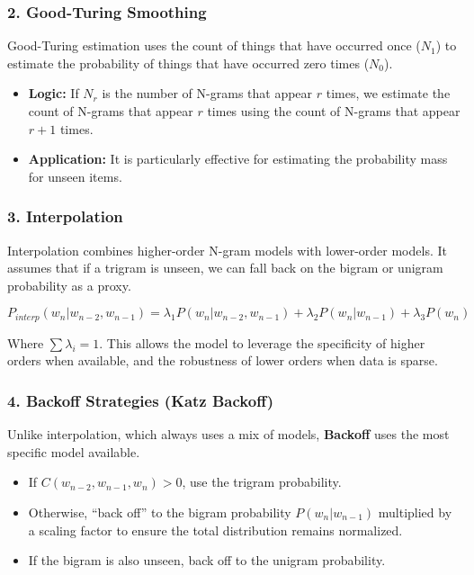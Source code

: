 \documentclass[
  italian,
  11pt,
]{article}
\providecommand{\tightlist}{%
  \setlength{\itemsep}{0pt}\setlength{\parskip}{0pt}}
\begin{document}
\subsubsection{2. Good-Turing Smoothing}\label{good-turing-smoothing}

Good-Turing estimation uses the count of things that have occurred once
(\(N_1\)) to estimate the probability of things that have occurred zero
times (\(N_0\)).

\begin{itemize}
\tightlist
\item
  \textbf{Logic:} If \(N_r\) is the number of N-grams that appear \(r\)
  times, we estimate the count of N-grams that appear \(r\) times using
  the count of N-grams that appear \(r+1\) times.
\item
  \textbf{Application:} It is particularly effective for estimating the
  probability mass for unseen items.
\end{itemize}

\subsubsection{3. Interpolation}\label{interpolation}

Interpolation combines higher-order N-gram models with lower-order
models. It assumes that if a trigram is unseen, we can fall back on the
bigram or unigram probability as a proxy.

\[P_{interp}(w_n | w_{n-2}, w_{n-1}) = \lambda_1 P(w_n | w_{n-2}, w_{n-1}) + \lambda_2 P(w_n | w_{n-1}) + \lambda_3 P(w_n)\]

Where \(\sum \lambda_i = 1\). This allows the model to leverage the
specificity of higher orders when available, and the robustness of lower
orders when data is sparse.

\subsubsection{4. Backoff Strategies (Katz
Backoff)}\label{backoff-strategies-katz-backoff}

Unlike interpolation, which always uses a mix of models,
\textbf{Backoff} uses the most specific model available.

\begin{itemize}
\tightlist
\item
  If \(C(w_{n-2}, w_{n-1}, w_n) > 0\), use the trigram probability.
\item
  Otherwise, ``back off'' to the bigram probability \(P(w_n | w_{n-1})\)
  multiplied by a scaling factor to ensure the total distribution
  remains normalized.
\item
  If the bigram is also unseen, back off to the unigram probability.
\end{itemize}
\end{document}
